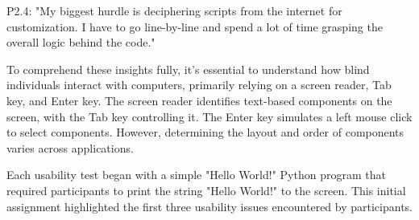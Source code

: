 P2.4: "My biggest hurdle is deciphering scripts from the internet for customization. I have to go line-by-line and spend a lot of time grasping the overall logic behind the code."

To comprehend these insights fully, it's essential to understand how blind individuals interact with computers, primarily relying on a screen reader, Tab key, and Enter key. The screen reader identifies text-based components on the screen, with the Tab key controlling it. The Enter key simulates a left mouse click to select components. However, determining the layout and order of components varies across applications.

Each usability test began with a simple "Hello World!" Python program that required participants to print the string "Hello World!" to the screen. This initial assignment highlighted the first three usability issues encountered by participants.







